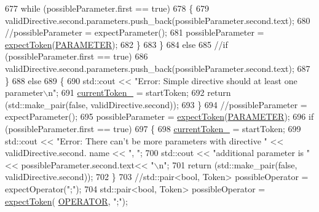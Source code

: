\begin{DoxyCode}
677                 \textcolor{keywordflow}{while} (possibleParameter.first == \textcolor{keyword}{true})
678                 \{
679                     validDirective.second.parameters.push\_back(possibleParameter.second.text);
680                     \textcolor{comment}{//possibleParameter = expectParameter();}
681                     possibleParameter = \hyperlink{classft_1_1_parser_a1615a752d3642bb53598e2c8db810db0}{expectToken}(\hyperlink{namespaceft_aa520fbf142ba1e7e659590c07da31921a194cde856bd2d79eac8adb9741c55940}{PARAMETER});
682                 \}
683             \}
684             \textcolor{keywordflow}{else}
685                 \textcolor{comment}{//if (possibleParameter.first == true)}
686                 validDirective.second.parameters.push\_back(possibleParameter.second.text);
687         \}
688         \textcolor{keywordflow}{else}
689         \{
690             std::cout << \textcolor{stringliteral}{"Error: Simple directive should at least one parameter\(\backslash\)n"};
691             \hyperlink{classft_1_1_parser_a942c5b794d108f144c5b5028aaa34cb6}{currentToken\_} = startToken;
692             \textcolor{keywordflow}{return} (std::make\_pair(\textcolor{keyword}{false}, validDirective.second));
693         \}
694         \textcolor{comment}{//possibleParameter = expectParameter();}
695         possibleParameter = \hyperlink{classft_1_1_parser_a1615a752d3642bb53598e2c8db810db0}{expectToken}(\hyperlink{namespaceft_aa520fbf142ba1e7e659590c07da31921a194cde856bd2d79eac8adb9741c55940}{PARAMETER});
696         \textcolor{keywordflow}{if} (possibleParameter.first == \textcolor{keyword}{true})
697         \{
698             \hyperlink{classft_1_1_parser_a942c5b794d108f144c5b5028aaa34cb6}{currentToken\_} = startToken;
699             std::cout << \textcolor{stringliteral}{"Error: There can't be more parameters with directive "} << validDirective.second.
      name << \textcolor{stringliteral}{", "};
700             std::cout << \textcolor{stringliteral}{"additional parameter is "} << possibleParameter.second.text<< \textcolor{stringliteral}{"\(\backslash\)n"};
701             \textcolor{keywordflow}{return} (std::make\_pair(\textcolor{keyword}{false}, validDirective.second));
702         \}
703         \textcolor{comment}{//std::pair<bool, Token> possibleOperator = expectOperator(";");}
704         std::pair<bool, Token> possibleOperator = \hyperlink{classft_1_1_parser_a1615a752d3642bb53598e2c8db810db0}{expectToken}(
      \hyperlink{namespaceft_aa520fbf142ba1e7e659590c07da31921a6411d9d6073252e4d316493506bbb979}{OPERATOR}, \textcolor{stringliteral}{";"});

\end{DoxyCode}
